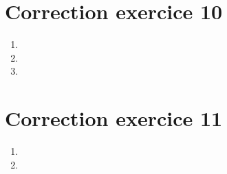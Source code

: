 \documentclass[a4paper, 11pt, titlepage]{article}
\begin{document}
\section{Correction exercice 10}
\begin{enumerate}[label=(\alph*)]
\item

\item 

\item 

\end{enumerate}

\section{Correction exercice 11}
\begin{enumerate}[label=(\alph*)]
\item

\item 


\end{enumerate}
\end{document}
